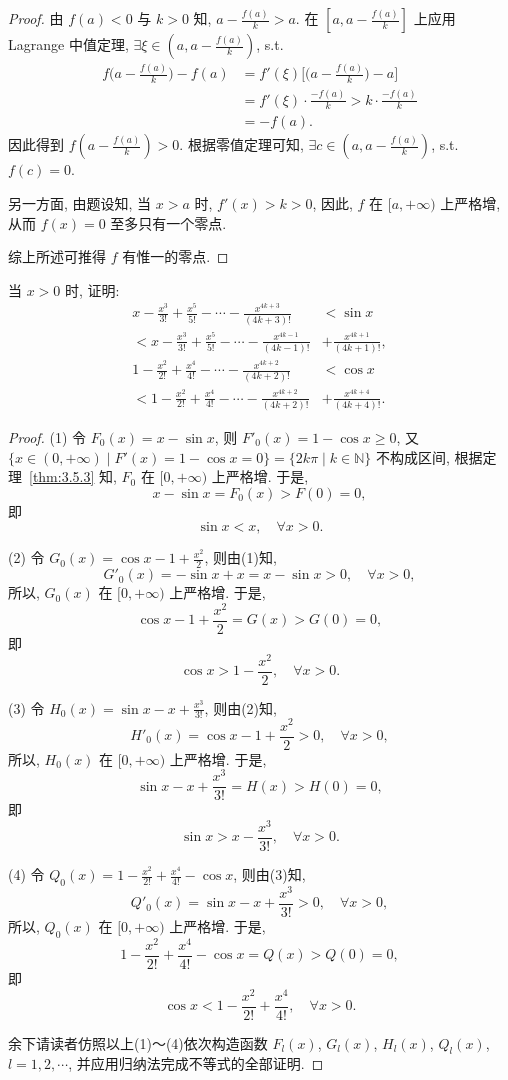 \begin{proof}
由 $f(a)<0$ 与 $k>0$ 知, $a-\frac{f(a)}{k}>a$. 在 $\left[a,a-\frac{f(a)}{k}\right]$ 上应用 Lagrange 中值定理, $\exists\xi\in\left(a,a-\frac{f(a)}{k}\right)$, s.t.
\[
\begin{aligned}
f\Big(a-\frac{f(a)}{k}\Big)-f(a)&=f'(\xi)\Big[\Big(a-\frac{f(a)}{k}\Big)-a\Big]\\
&=f'(\xi)\cdot\frac{-f(a)}{k}>k\cdot\frac{-f(a)}{k}\\
&=-f(a).
\end{aligned}
\]
因此得到 $f\left(a-\frac{f(a)}{k}\right)>0$. 根据零值定理可知, $\exists c\in\left(a,a-\frac{f(a)}{k}\right)$, s.t. $f(c)=0$.

另一方面, 由题设知, 当 $x>a$ 时, $f'(x)>k>0$, 因此, $f$ 在 $[a,+\infty)$ 上严格增, 从而 $f(x)=0$ 至多只有一个零点.

综上所述可推得 $f$ 有惟一的零点.
\end{proof}

\begin{example}\label{ex:3.5.8}
当 $x>0$ 时, 证明:
\[
\begin{aligned}
x-\frac{x^{3}}{3!}+\frac{x^{5}}{5!}-\cdots-\frac{x^{4k+3}}{(4k+3)!}&<\sin x\\
<x-\frac{x^{3}}{3!}+\frac{x^{5}}{5!}-\cdots-\frac{x^{4k-1}}{(4k-1)!}&+\frac{x^{4k+1}}{(4k+1)!},\\
1-\frac{x^{2}}{2!}+\frac{x^{4}}{4!}-\cdots-\frac{x^{4k+2}}{(4k+2)!}&<\cos x\\
<1-\frac{x^{2}}{2!}+\frac{x^{4}}{4!}-\cdots-\frac{x^{4k+2}}{(4k+2)!}&+\frac{x^{4k+4}}{(4k+4)!}.
\end{aligned}
\]
\end{example}

\begin{proof}
(1) 令 $F_{0}(x)=x-\sin x$, 则 $F'_{0}(x)=1-\cos x\geqslant 0$, 又 $\{x\in(0,+\infty)\mid F'(x)=1-\cos x=0\}=\{2k\pi\mid k\in\mathbb{N}\}$ 不构成区间, 根据定理~\ref{thm:3.5.3} 知, $F_{0}$ 在 $[0,+\infty)$ 上严格增. 于是,
\[
x-\sin x=F_{0}(x)>F(0)=0,
\]
即
\[
\sin x<x,\quad\forall x>0.
\]

(2) 令 $G_{0}(x)=\cos x-1+\frac{x^{2}}{2}$, 则由(1)知,
\[
G'_{0}(x)=-\sin x+x=x-\sin x>0,\quad\forall x>0,
\]
所以, $G_{0}(x)$ 在 $[0,+\infty)$ 上严格增. 于是,
\[
\cos x-1+\frac{x^{2}}{2}=G(x)>G(0)=0,
\]
即
\[
\cos x>1-\frac{x^{2}}{2},\quad\forall x>0.
\]

(3) 令 $H_{0}(x)=\sin x-x+\frac{x^{3}}{3!}$, 则由(2)知,
\[
H'_{0}(x)=\cos x-1+\frac{x^{2}}{2}>0,\quad\forall x>0,
\]
所以, $H_{0}(x)$ 在 $[0,+\infty)$ 上严格增. 于是,
\[
\sin x-x+\frac{x^{3}}{3!}=H(x)>H(0)=0,
\]
即
\[
\sin x>x-\frac{x^{3}}{3!},\quad\forall x>0.
\]

(4) 令 $Q_{0}(x)=1-\frac{x^{2}}{2!}+\frac{x^{4}}{4!}-\cos x$, 则由(3)知,
\[
Q'_{0}(x)=\sin x-x+\frac{x^{3}}{3!}>0,\quad\forall x>0,
\]
所以, $Q_{0}(x)$ 在 $[0,+\infty)$ 上严格增. 于是,
\[
1-\frac{x^{2}}{2!}+\frac{x^{4}}{4!}-\cos x=Q(x)>Q(0)=0,
\]
即
\[
\cos x<1-\frac{x^{2}}{2!}+\frac{x^{4}}{4!},\quad\forall x>0.
\]

余下请读者仿照以上(1)～(4)依次构造函数 $F_{l}(x)$, $G_{l}(x)$, $H_{l}(x)$, $Q_{l}(x)$, $l=1,2,\cdots$, 并应用归纳法完成不等式的全部证明.
\end{proof}

